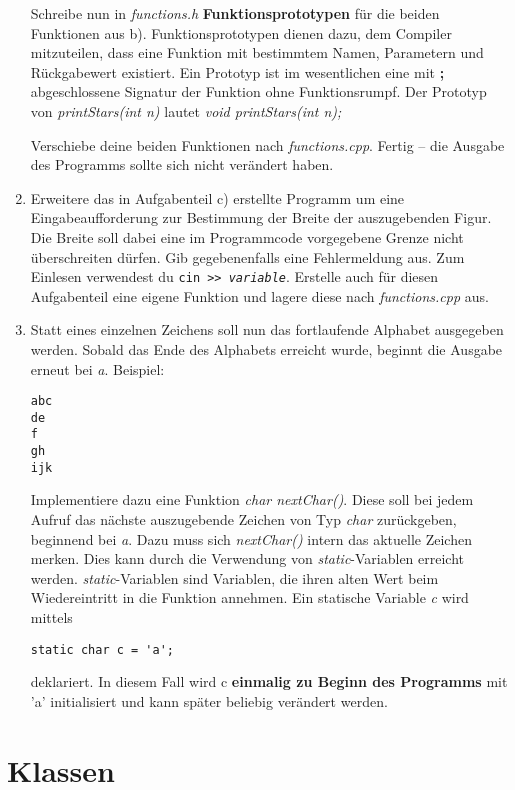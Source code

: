 \begin{enumerate}
Schreibe nun in \emph{functions.h} \textbf{Funktionsprototypen} für die beiden Funktionen aus b).
Funktionsprototypen dienen dazu, dem Compiler mitzuteilen, dass eine Funktion mit bestimmtem Namen, Parametern und Rückgabewert existiert.
Ein Prototyp ist im wesentlichen eine mit \textbf{;} abgeschlossene Signatur der Funktion ohne Funktionsrumpf.
Der Prototyp von \emph{printStars(int n)} lautet \emph{void printStars(int n);}

Verschiebe deine beiden Funktionen nach \emph{functions.cpp}.
Fertig -- die Ausgabe des Programms sollte sich nicht verändert haben.

\item
Erweitere das in Aufgabenteil c) erstellte Programm um eine Eingabeaufforderung zur Bestimmung der Breite der auszugebenden Figur.
Die Breite soll dabei eine im Programmcode vorgegebene Grenze nicht überschreiten dürfen.
Gib gegebenenfalls eine Fehlermeldung aus.
Zum Einlesen verwendest du \texttt{cin >{}> \emph{variable}}.
Erstelle auch für diesen Aufgabenteil eine eigene Funktion und lagere diese nach \emph{functions.cpp} aus.

\item Statt eines einzelnen Zeichens soll nun das fortlaufende Alphabet ausgegeben werden.
Sobald das Ende des Alphabets erreicht wurde, beginnt die Ausgabe erneut bei \emph{a}. Beispiel:
\begin{lstlisting}
abc
de
f
gh
ijk
\end{lstlisting}

Implementiere dazu eine Funktion \emph{char nextChar()}.
Diese soll bei jedem Aufruf das nächste auszugebende Zeichen von Typ \emph{char} zurückgeben, beginnend bei \emph{\textquotesingle a\textquotesingle}.
Dazu muss sich \emph{nextChar()} intern das aktuelle Zeichen merken.
Dies kann durch die Verwendung von \emph{static}-Variablen erreicht werden. \emph{static}-Variablen sind Variablen, die ihren alten Wert beim Wiedereintritt in die Funktion annehmen.
Ein statische Variable \emph{c} wird mittels 
\begin{lstlisting}
static char c = 'a';
\end{lstlisting}
deklariert.
In diesem Fall wird c \textbf{einmalig zu Beginn des Programms} mit 'a' initialisiert und kann später beliebig verändert werden.
\end{enumerate} 

\section{Klassen}

